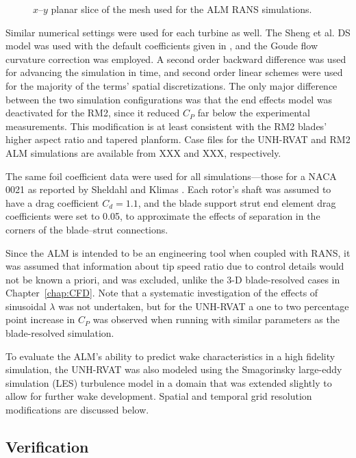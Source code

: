 \begin{figure}
    
    \caption{$x$--$y$ planar slice of the mesh used for the ALM RANS
        simulations.}
    
    \label{fig:ALM-mesh}
\end{figure}

Similar numerical settings were used for each turbine as well. The Sheng et al.
DS model was used with the default coefficients given in \cite{Sheng2008}, and
the Goude flow curvature correction was employed. A second order backward
difference was used for advancing the simulation in time, and second order
linear schemes were used for the majority of the terms' spatial discretizations.
The only major difference between the two simulation configurations was that the
end effects model was deactivated for the RM2, since it reduced $C_P$ far below
the experimental measurements. This modification is at least consistent with the
RM2 blades' higher aspect ratio and tapered planform. Case files for the
UNH-RVAT and RM2 ALM simulations are available from XXX and XXX, respectively.

The same foil coefficient data were used for all simulations---those for a NACA
0021 as reported by Sheldahl and Klimas \cite{Sheldahl1981}. Each rotor's shaft
was assumed to have a drag coefficient $C_d = 1.1$, and the blade support strut
end element drag coefficients were set to 0.05, to approximate the effects of
separation in the corners of the blade--strut connections.

Since the ALM is intended to be an engineering tool when coupled with RANS, it
was assumed that information about tip speed ratio due to control details would
not be known a priori, and was excluded, unlike the 3-D blade-resolved cases in
Chapter~\ref{chap:CFD}. Note that a systematic investigation of the effects of
sinusoidal $\lambda$ was not undertaken, but for the UNH-RVAT a one to two
percentage point increase in $C_P$ was observed when running with similar
parameters as the blade-resolved simulation.

To evaluate the ALM's ability to predict wake characteristics in a high fidelity
simulation, the UNH-RVAT was also modeled using the Smagorinsky large-eddy
simulation (LES) turbulence model \cite{Smagorinsky1963} in a domain that was
extended slightly to allow for further wake development. Spatial and temporal
grid resolution modifications are discussed below.


\subsection{Verification}

